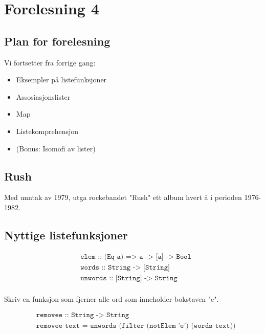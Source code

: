 \documentclass{article}
\begin{document}
    \section{Forelesning 4}

    \subsection{Plan for forelesning}

    Vi fortsetter fra forrige gang:
    \begin{itemize}
        \item Eksempler på listefunksjoner
        \item Assosiasjonslister
        \item Map
        \item Listekomprehensjon
        \item (Bonus: Isomofi av lister)
    \end{itemize}

    \subsection{Rush}

    Med unntak av 1979, utga rockebandet "Rush" ett album hvert å i perioden 1976-1982.

    \subsection{Nyttige listefunksjoner}


    \begin{align*}
        &\texttt{elem :: (Eq  a) => a -> [a] -> Bool} \\
        &\texttt{words :: String -> [String]} \\
        &\texttt{unwords :: [String] -> String} \\
    \end{align*}

    \begin{eg}
        Skriv en funksjon som fjerner alle ord som inneholder bokstaven "e".

    \end{eg}

    \begin{align*}
        &\texttt{removee :: String -> String} \\
        &\texttt{removee text = unwords (filter (notElem 'e') (words text))} \\
    \end{align*}
\end{document}
